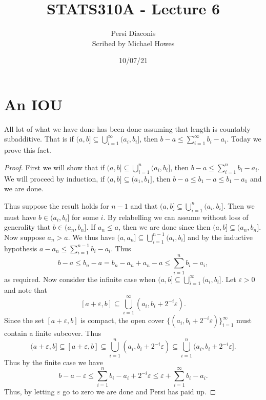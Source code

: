 




\title{STATS310A - Lecture 6}
\author{Persi Diaconis\\ Scribed by Michael Howes}
\date{10/07/21}

\pagestyle{fancy}
\fancyhf{}


\maketitle
\tableofcontents
\section{An IOU}
All lot of what we have done has been done assuming that length is countably subadditive. That is if $(a,b] \subseteq \bigcup_{i=1}^\infty (a_i,b_i]$, then $b-a \le \sum_{i=1}^\infty b_i-a_i$. Today we prove this fact.
\begin{proof}
    First we will show that if $(a,b] \subseteq \bigcup_{i=1}^n (a_i,b_i]$, then $b-a \le \sum_{i=1}^n b_i -a_i$. We will proceed by induction, if $(a,b] \subseteq (a_1,b_1]$, then $b-a\le b_1-a\le b_1-a_1$ and we are done. 
    
    Thus suppose the result holds for $n-1$ and that $(a,b] \subseteq \bigcup_{i=1}^n (a_i,b_i]$. Then we must have $b \in (a_i,b_i]$ for some $i$. By relabelling we can assume without loss of generality that $b\in (a_n,b_n]$. If $a_n \le a$, then we are done since then $(a,b] \subseteq (a_n,b_n]$. Now suppose $a_n > a$. We thus have $(a,a_n] \subseteq \bigcup_{i=1}^{n-1}(a_i,b_i]$ and by the inductive hypothesis $a-a_n \le \sum_{i=1}^{n-1} b_i - a_i$. Thus 
    \[b-a \le b_n -a = b_n-a_n + a_n - a \le \sum_{i=1}^n b_i - a_i, \]
    as required. Now consider the infinite case when $(a,b] \subseteq \bigcup_{i=1}^\infty (a_i,b_i]$. Let $\varepsilon > 0$ and note that 
    \[[a+\varepsilon, b] \subseteq \bigcup_{i=1}^\infty (a_i,b_i+2^{-i}\varepsilon). \]
    Since the set $[a+\varepsilon,b]$ is compact, the open cover $\{(a_i,b_i+2^{-i}\varepsilon)\}_{i=1}^\infty$ must contain a finite subcover. Thus
    \[(a+\varepsilon,b] \subseteq [a+\varepsilon, b] \subseteq \bigcup_{i=1}^n (a_i, b_i+2^{-i}\varepsilon) \subseteq \bigcup_{i=1}^n (a_i, b_i+2^{-i}\varepsilon].  \]
    Thus by the finite case we have
    \[b-a-\varepsilon \le \sum_{i=1}^n b_i-a_i+2^{-i}\varepsilon \le \varepsilon+\sum_{i=1}^\infty b_i-a_i. \]
    Thus, by letting $\varepsilon$ go to zero we are done and Persi has paid up.
\end{proof}
